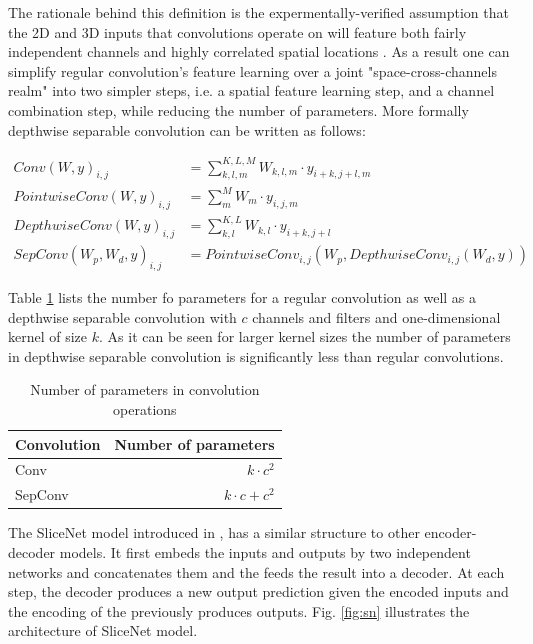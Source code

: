 \documentclass[a4paper]{article}
\begin{document}
The rationale behind this definition  is  the  expermentally-verified assumption
that the  2D and 3D inputs that convolutions operate on will feature both fairly
independent    channels    and    highly    correlated     spatial     locations
\cite{DBLP:journals/corr/KaiserGC17}.  As  a  result one  can  simplify  regular
convolution's  feature  learning over  a joint "space-cross-channels realm" into
two  simpler  steps,  i.e.  a  spatial  feature  learning  step,  and a  channel
combination  step, while  reducing  the  number  of  parameters.  More  formally
depthwise separable convolution can be written as follows:


\begin{align*}
  Conv(W, y)_{i,j} &= \sum_{k,l,m}^{K,L,M}{W_{k,l,m} \cdot y_{i+k,j+l,m}} \\
  PointwiseConv(W, y)_{i,j} &= \sum_{m}^{M}{W_m \cdot y_{i,j,m}} \\
  DepthwiseConv(W, y)_{i,j} &= \sum_{k,l}^{K,L}{W_{k,l} \cdot y_{i+k,j+l}} \\
  SepConv(W_p, W_d, y)_{i,j} &=
    PointwiseConv_{i,j}(W_p, DepthwiseConv_{i,j}(W_d, y))
\end{align*}


Table \ref{tab:convpar} lists the number fo parameters for a regular convolution
as well as a depthwise separable  convolution with  $c$ channels and filters and
one-dimensional kernel  of  size $k$. As it can be seen  for larger kernel sizes
the number  of  parameters in  depthwise separable convolution  is significantly
less than regular convolutions.


\begin{table}
  \center
  \begin{tabular}{lr}
  \hline
    Convolution & Number of parameters\\
  \hline
    Conv & $k \cdot c^2$ \\
    SepConv & $k \cdot c + c^2$ \\
  \hline
  \end{tabular}
  \caption{Number of parameters in convolution operations}
  \label{tab:convpar}
\end{table}


The SliceNet  model  introduced  in \cite{DBLP:journals/corr/KaiserGC17},  has a
similar structure  to other encoder-decoder models. It  first embeds the  inputs
and outputs by two independent networks  and concatenates them and the feeds the
result  into  a  decoder. At  each  step,  the  decoder produces  a  new  output
prediction given the  encoded inputs and the encoding of the previously produces
outputs. Fig. \ref{fig:sn} illustrates the architecture of SliceNet model.
\end{document}
